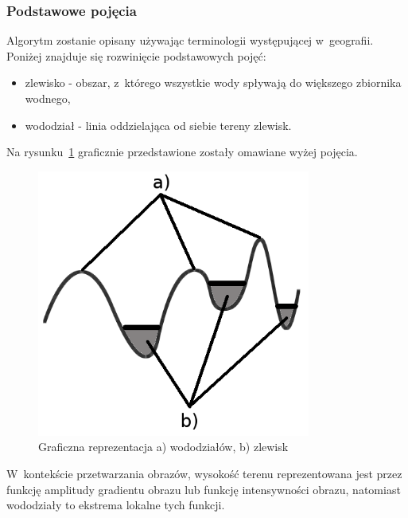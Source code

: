 \subsubsection{Podstawowe pojęcia}
Algorytm zostanie opisany używając terminologii występującej w~geografii. Poniżej znajduje się rozwinięcie podstawowych pojęć:
\begin{itemize}
  \item zlewisko - obszar, z~którego wszystkie wody spływają do większego zbiornika wodnego,
  \item wododział - linia oddzielająca od siebie tereny zlewisk.
\end{itemize}
Na rysunku~\ref{fig:watershed_graphic} graficznie przedstawione zostały omawiane wyżej pojęcia.
\begin{figure}
  \centering
  \includegraphics[width=9cm]{img/watershed-graphic}
  \caption{Graficzna reprezentacja a) wododziałów, b) zlewisk }
  \label{fig:watershed_graphic}
\end{figure}
 W~kontekście przetwarzania obrazów, wysokość terenu reprezentowana jest przez funkcję amplitudy gradientu obrazu lub funkcję intensywności obrazu, natomiast wododziały to ekstrema lokalne tych funkcji.
